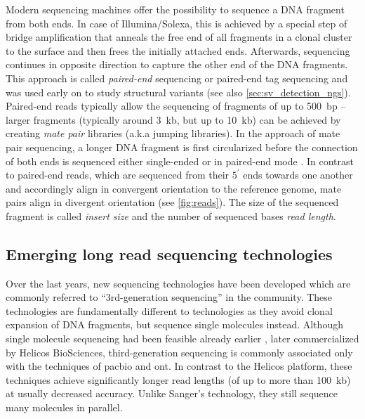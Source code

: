 Modern sequencing machines offer the possibility to sequence a DNA fragment
from both ends. In case of Illumina/Solexa, this is achieved by a special step
of bridge amplification that anneals the free end of all fragments in a clonal
cluster to the surface and then frees the initially attached ends. Afterwards,
sequencing continues in opposite direction to capture the other end of the
DNA fragments. This approach is called \emph{paired-end} sequencing or
paired-end tag sequencing and was used early on to study structural variants
\citep{Campbell2008} (see also \cref{sec:sv_detection_ngs}). Paired-end reads
typically allow the sequencing of fragments of up to 500~bp – larger fragments
(typically around 3~kb, but up to 10~kb) can be achieved by creating
\emph{mate pair} libraries (a.k.a jumping libraries). In the approach of mate
pair sequencing, a longer DNA fragment is first circularized before the
connection of both ends is sequenced either single-ended or in paired-end mode
\citep{Korbel2007}. In contrast to paired-end reads, which are sequenced from
their $5^\prime$ ends towards one another and accordingly align in convergent
orientation to the reference genome, mate pairs align in divergent orientation
(see \cref{fig:reads}). The size of the sequenced fragment is called
\emph{insert size} and the number of sequenced bases \emph{read length}.








\subsection{Emerging long read sequencing technologies}
\label{sec:long_read_seq}

Over the last years, new sequencing technologies have been developed which are
commonly referred to ``3rd-generation sequencing'' in the community. These
technologies are fundamentally different to \mps technologies as they avoid
clonal expansion of DNA fragments, but sequence single molecules instead.
Although single molecule sequencing had been feasible already earlier
\citep{Braslavsky2003}, later commercialized by Helicos BioSciences,
third-generation sequencing is commonly associated only with the techniques of
\acf{pacbio} and \acf{ont}. In contrast to the Helicos platform, these
techniques achieve significantly longer read lengths (of up to more than 100~kb)
at usually decreased accuracy. Unlike Sanger's technology, they still sequence
many molecules in parallel.

